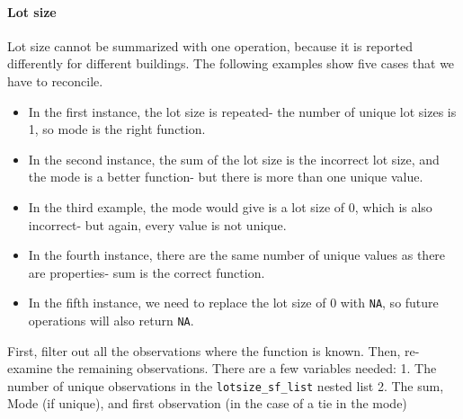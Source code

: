 \documentclass[]{article}
\newenvironment{Shaded}{\begin{snugshade}}{\end{snugshade}}
\newcommand{\KeywordTok}[1]{\textcolor[rgb]{0.13,0.29,0.53}{\textbf{#1}}}
\newcommand{\DataTypeTok}[1]{\textcolor[rgb]{0.13,0.29,0.53}{#1}}
\newcommand{\DecValTok}[1]{\textcolor[rgb]{0.00,0.00,0.81}{#1}}
\newcommand{\StringTok}[1]{\textcolor[rgb]{0.31,0.60,0.02}{#1}}
\newcommand{\OtherTok}[1]{\textcolor[rgb]{0.56,0.35,0.01}{#1}}
\newcommand{\ControlFlowTok}[1]{\textcolor[rgb]{0.13,0.29,0.53}{\textbf{#1}}}
\newcommand{\OperatorTok}[1]{\textcolor[rgb]{0.81,0.36,0.00}{\textbf{#1}}}
\newcommand{\NormalTok}[1]{#1}
\providecommand{\tightlist}{%
  \setlength{\itemsep}{0pt}\setlength{\parskip}{0pt}}
\let\oldparagraph\paragraph
\renewcommand{\paragraph}[1]{\oldparagraph{#1}\mbox{}}
\begin{document}
\paragraph{Lot size}\label{lot-size}

Lot size cannot be summarized with one operation, because it is reported
differently for different buildings. The following examples show five
cases that we have to reconcile.

\begin{itemize}
\tightlist
\item
  In the first instance, the lot size is repeated- the number of unique
  lot sizes is 1, so mode is the right function.
\item
  In the second instance, the sum of the lot size is the incorrect lot
  size, and the mode is a better function- but there is more than one
  unique value.
\item
  In the third example, the mode would give is a lot size of 0, which is
  also incorrect- but again, every value is not unique.
\item
  In the fourth instance, there are the same number of unique values as
  there are properties- sum is the correct function.
\item
  In the fifth instance, we need to replace the lot size of 0 with
  \texttt{NA}, so future operations will also return \texttt{NA}.
\end{itemize}

First, filter out all the observations where the function is known.
Then, re-examine the remaining observations. There are a few variables
needed: 1. The number of unique observations in the
\texttt{lotsize\_sf\_list} nested list 2. The sum, Mode (if unique), and
first observation (in the case of a tie in the mode)

\begin{Shaded}
\end{Shaded}
\end{document}
